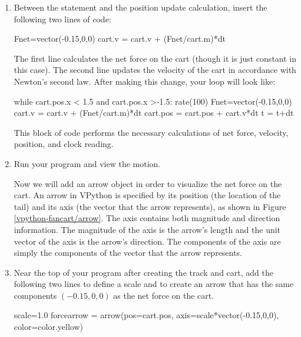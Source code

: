 \begin{enumerate}
\item Between the  statement and the position update calculation, insert the following two lines of code:

\begin{myvpython}
	Fnet=vector(-0.15,0,0)
	cart.v = cart.v + (Fnet/cart.m)*dt
\end{myvpython}

The first line calculates the net force on the cart (though it is just constant in this case). The second line updates the velocity of the cart in accordance with Newton's second law. After making this change, your  loop will look like:

\begin{vpythonblock}
while cart.pos.x < 1.5 and cart.pos.x >-1.5:
	rate(100)
	Fnet=vector(-0.15,0,0)
	cart.v = cart.v + (Fnet/cart.m)*dt
	cart.pos = cart.pos + cart.v*dt
	t = t+dt
\end{vpythonblock}

This block of code performs the necessary calculations of net force, velocity, position, and clock reading.

\item Run your program and view the motion.


Now we will add an arrow object in order to visualize the net force on the cart.  An arrow in VPython is specified by its position (the location of the tail) and its axis (the vector that the arrow represents), as shown in Figure \ref{vpython-fancart/arrow}. The axis contains both magnitude and direction information. The magnitude of the axis is the arrow's length and the unit vector of the axis is the arrow's direction. The components of the axis are simply the components of the vector that the arrow represents.


\item Near the top of your program after creating the track and cart, add the following two lines to define a scale and to create an arrow that has the same components $(-0.15,0,0)$ as the net force on the cart.

\begin{myvpython}
scale=1.0
forcearrow = arrow(pos=cart.pos, axis=scale*vector(-0.15,0,0), color=color.yellow)
\end{myvpython}


\end{enumerate}
